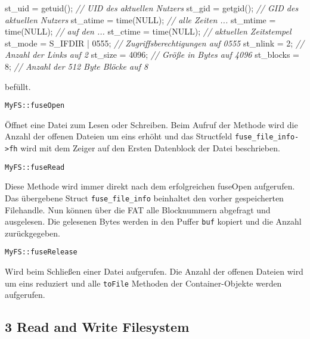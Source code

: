 \documentclass[]{article}
\newenvironment{Shaded}{}{}
\newcommand{\CommentTok}[1]{\textcolor[rgb]{0.38,0.63,0.69}{\textit{#1}}}
\newcommand{\DecValTok}[1]{\textcolor[rgb]{0.25,0.63,0.44}{#1}}
\newcommand{\NormalTok}[1]{#1}
\begin{document}
\begin{Shaded}
  \begin{framed}
\begin{Highlighting}[]
\NormalTok{st_uid = getuid();        }\CommentTok{// UID des aktuellen Nutzers}
\NormalTok{st_gid = getgid();        }\CommentTok{// GID des aktuellen Nutzers}
\NormalTok{st_atime = time(NULL);    }\CommentTok{// alle Zeiten ...}
\NormalTok{st_mtime = time(NULL);    }\CommentTok{// auf den ...}
\NormalTok{st_ctime = time(NULL);    }\CommentTok{// aktuellen Zeitstempel}
\NormalTok{st_mode = S_IFDIR | }\DecValTok{0555}\NormalTok{; }\CommentTok{// Zugriffsberechtigungen auf 0555}
\NormalTok{st_nlink = }\DecValTok{2}\NormalTok{;             }\CommentTok{// Anzahl der Links auf 2}
\NormalTok{st_size = }\DecValTok{4096}\NormalTok{;           }\CommentTok{// Größe in Bytes auf 4096}
\NormalTok{st_blocks = }\DecValTok{8}\NormalTok{;            }\CommentTok{// Anzahl der 512 Byte Blöcke auf 8}
\end{Highlighting}
\end{framed}
\end{Shaded}

befüllt.

\texttt{MyFS::fuseOpen}

Öffnet eine Datei zum Lesen oder Schreiben. Beim Aufruf der Methode wird
die Anzahl der offenen Dateien um eins erhöht und das Structfeld
\texttt{fuse\_file\_info-\textgreater{}fh} wird mit dem Zeiger auf den
Ersten Datenblock der Datei beschrieben.

\texttt{MyFS::fuseRead}

Diese Methode wird immer direkt nach dem erfolgreichen fuseOpen
aufgerufen. Das übergebene Struct \texttt{fuse\_file\_info} beinhaltet
den vorher gespeicherten Filehandle. Nun können über die FAT alle
Blocknummern abgefragt und ausgelesen. Die gelesenen Bytes werden in den
Puffer \texttt{buf} kopiert und die Anzahl zurückgegeben.

\texttt{MyFS::fuseRelease}

Wird beim Schließen einer Datei aufgerufen. Die Anzahl der offenen
Dateien wird um eins reduziert und alle \texttt{toFile} Methoden der
Container-Objekte werden aufgerufen.

\hypertarget{read-and-write-filesystem}{%
\subsection{3 Read and Write
Filesystem}\label{read-and-write-filesystem}}
\end{document}
